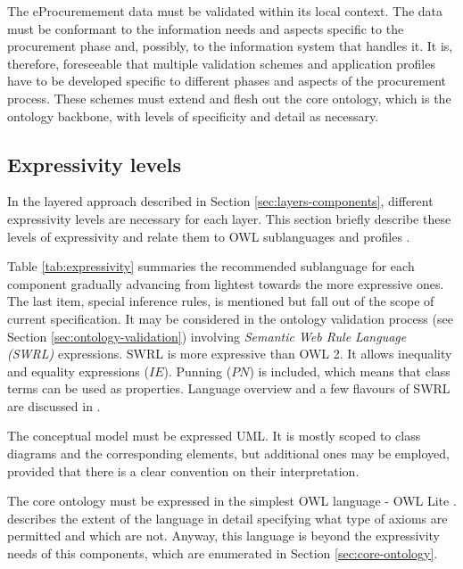 	The eProcuremement data must be validated within its local context. The data must be conformant to the information needs and aspects specific to the procurement phase and, possibly, to the information system that handles it. It is, therefore, foreseeable that multiple validation schemes and application profiles have to be developed specific to different phases and aspects of the procurement process. These schemes must extend and flesh out the core ontology, which is the ontology backbone, with levels of specificity and detail as necessary. 
	
	
	\subsection{Expressivity levels}
	\label{sec:expressivity}

	In the layered approach described in Section \ref{sec:layers-components}, different expressivity levels are necessary for each layer. This section briefly describe these levels of expressivity and relate them to OWL sublanguages \citep{owl1} and profiles \citep{owl2-profiles}. 
	
	Table \ref{tab:expressivity} summaries the recommended sublanguage for each component gradually advancing from lightest towards the more expressive ones. The last item, special inference rules, is mentioned but fall out of the scope of current specification. It may be considered in the ontology validation process (see Section \ref{sec:ontology-validation}) involving \textit{Semantic Web Rule Language (SWRL)} expressions. SWRL \citep{swrl-horrocks2004} is more expressive than OWL 2. It allows inequality and equality expressions ($IE$). Punning ($PN$) is included, which means that class terms can be used as properties. Language overview and a few flavours of SWRL are discussed in \cite{swrl-expressivness}.
	
	The conceptual model must be expressed UML. It is mostly scoped to class diagrams and the corresponding elements, but additional ones may be employed, provided that there is a clear convention on their interpretation. 
	
	The core ontology must be expressed in the simplest OWL language - OWL Lite \cite{owl1}. \citet[Sec.8.3]{owl1} describes the extent of the language in detail specifying what type of axioms are permitted and which are not. Anyway, this language is beyond the expressivity needs of this components, which are enumerated in Section \ref{sec:core-ontology}.
	
